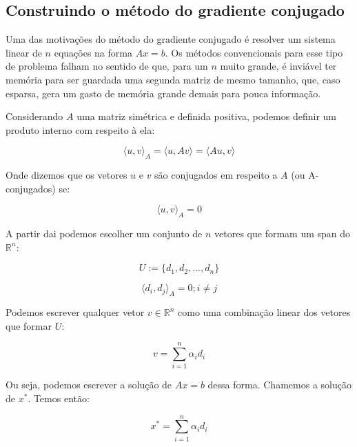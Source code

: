 \subsection{Construindo o método do gradiente conjugado}

Uma das motivações do método do gradiente conjugado \cite{bonnans2006numerical}
\cite{1987polyak} é resolver um sistema linear de \(n\) equações na forma \(Ax = b \).
Os métodos convencionais para esse tipo de problema falham no sentido de que, para um
\(n\) muito grande, é inviável ter memória para ser guardada uma segunda matriz de
mesmo tamanho, que, caso esparsa, gera um gasto de memória grande demais para pouca
informação.

Considerando \(A\) uma matriz simétrica e definida positiva, podemos definir um produto
interno com respeito à ela:

\begin{equation}
\langle u, v \rangle_A = \langle u, Av \rangle =  \langle Au, v \rangle 
\end{equation}

Onde dizemos que os vetores \(u\) e \(v\) são conjugados em respeito a \(A\) (ou A-conjugados) se:

\begin{equation}
\langle u, v \rangle_A = 0
\end{equation}

A partir dai podemos escolher um conjunto de \(n\) vetores que formam um span do
\( \mathbb{R}^n \):

\begin{equation}
U := \{d_1, d_2, ..., d_n\}
\end{equation}

\begin{equation}
\label{gc_prod_interno}
\langle d_i, d_j \rangle_A = 0; i \ne j
\end{equation}

Podemos escrever qualquer vetor \(v \in \mathbb{R}^n\) como uma combinação linear dos
vetores que formar \(U\):

\begin{equation}
v = \sum_{i=1}^n \alpha_i d_i
\end{equation}

Ou seja, podemos escrever a solução de \(Ax = b\) dessa forma. Chamemos a solução de
\(x^*\). Temos então:

\begin{equation}
x^* = \sum_{i=1}^n \alpha_i d_i
\end{equation}

